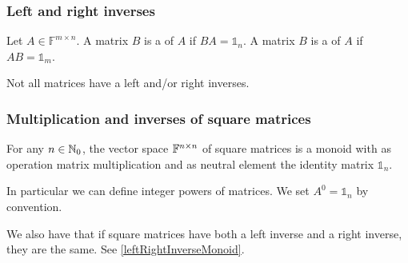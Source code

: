 \subsubsection{Left and right inverses}
\begin{definition}
Let $A\in \mathbb{F}^{m\times n}$. A matrix $B$ is a  of $A$ if $BA = \mathbb{1}_n$. A matrix $B$ is a  of $A$ if $AB = \mathbb{1}_m$.
\end{definition}
Not all matrices have a left and/or right inverses.

\subsubsection{Multiplication and inverses of square matrices}
\begin{lemma}
For any $n\in\mathbb{N}_0$, the vector space $\mathbb{F}^{n\times n}$ of square matrices is a monoid with as operation matrix multiplication and as neutral element the identity matrix $\mathbb{1}_n$.
\end{lemma}

In particular we can define integer powers of matrices. We set $A^0 = \mathbb{1}_n$ by convention.

We also have that if square matrices have both a left inverse and a right inverse, they are the same. See \ref{leftRightInverseMonoid}.

